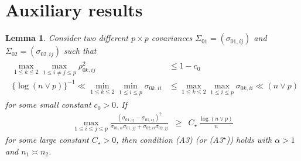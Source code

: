 \documentclass[11pt]{article}
\newtheorem{lemma}[theorem]{Lemma}
\newcommand{\bea}{\begin{eqnarray*}}
\newcommand{\eea}{\end{eqnarray*}}
\newcommand{\sg}{\Sigma}
\begin{document}
\section{Auxiliary results}\label{sec:auxil}
\begin{lemma}\label{lem:testable_two_cov}
	Consider two different $p\times p$ covariances $\sg_{01} = (\sigma_{01,ij})$ and $\sg_{02} = (\sigma_{02,ij})$ such that 
	\bea
	\begin{split}
		\max_{1\le k \le 2}\max_{1\le i\neq j \le p}\rho_{0k,ij}^2 &\le 1 - c_0 \\
		\{\log(n\vee p) \}^{-1} \ll \min_{1\le k \le 2}\min_{1\le i \le p} \sigma_{0k,ii} &\le \max_{1\le k \le 2}\max_{1\le i \le p} \sigma_{0k,ii} \ll (n\vee p)
	\end{split}
	\eea
	for some small constant $c_0>0$.
	If 
	\bea
	\max_{1\le i\le j\le p}\frac{ (\sigma_{01,ij} - \sigma_{01,ij})^2 }{ \sigma_{01,ii}\sigma_{01,jj} + \sigma_{02,ii}\sigma_{02,jj} } &\ge& C_\star  \, \frac{\log (n\vee p)}{n}
	\eea
	for some large constant $C_\star>0$, then condition (A3) (or (A3$^\star$)) holds with $\alpha>1$ and $n_1\asymp n_2$.
\end{lemma}
\end{document}
